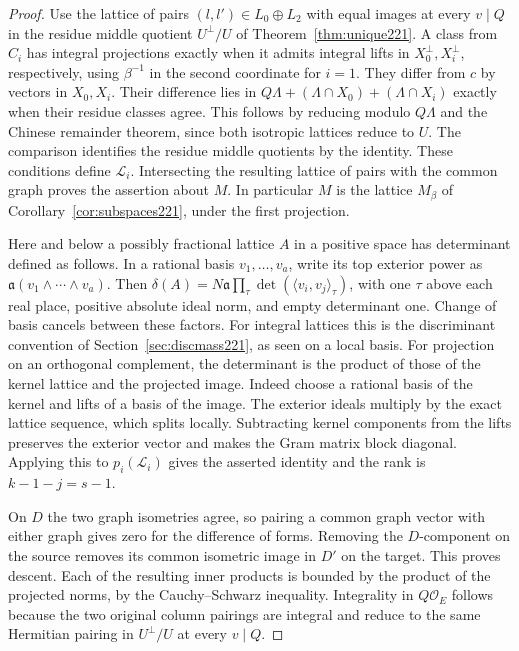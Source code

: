 \documentclass[a4paper,11pt]{article}
\theoremstyle{definition}
\theoremstyle{remark}
\numberwithin{equation}{section}
\newcommand{\OO}{\mathcal O}
\begin{document}
\begin{proof}
Use the lattice of pairs \((l,l')\in L_0\oplus L_2\) with
equal images at every \(v\mid Q\) in the residue middle
quotient \(U^\perp/U\) of Theorem~\ref{thm:unique221}.
A class from \(C_i\) has integral projections exactly when
it admits integral lifts in \(X_0^\perp,X_i^\perp\), respectively,
using \(\beta^{-1}\) in the second coordinate for \(i=1\).
They differ from \(c\) by vectors in \(X_0,X_i\). Their
difference lies in \(Q\Lambda+(\Lambda\cap X_0)+(\Lambda\cap X_i)\)
exactly when their residue classes agree. This follows by
reducing modulo \(Q\Lambda\) and the Chinese remainder
theorem, since both isotropic lattices reduce to \(U\).
The comparison identifies the residue middle quotients by
the identity. These conditions define \(\mathcal L_i\).
Intersecting the resulting lattice of pairs with the common
graph proves the assertion about \(M\). In particular \(M\)
is the lattice \(M_\beta\) of Corollary~\ref{cor:subspaces221},
under the first projection.

Here and below a possibly fractional lattice \(A\) in a
positive space has determinant defined as follows. In a
rational basis \(v_1,\ldots,v_a\), write its top exterior
power as \(\mathfrak a(v_1\wedge\cdots\wedge v_a)\).
Then \(\delta(A)=N\mathfrak a\prod_\tau\det
(\langle v_i,v_j\rangle_\tau)\), with one \(\tau\) above
each real place, positive absolute ideal norm, and empty
determinant one. Change of basis cancels between these
factors. For integral lattices this is the discriminant
convention of Section~\ref{sec:discmass221}, as seen on a
local basis. For projection on an orthogonal complement,
the determinant is the product of those of the kernel
lattice and the projected image. Indeed choose a rational
basis of the kernel and lifts of a basis of the image.
The exterior ideals multiply by the exact lattice sequence,
which splits locally. Subtracting kernel components from
the lifts preserves the exterior vector and makes the Gram
matrix block diagonal. Applying this to \(p_i(\mathcal L_i)\)
gives the asserted identity and the rank is \(k-1-j=s-1\).

On \(D\) the two graph isometries agree, so pairing a common
graph vector with either graph gives zero for the difference
of forms. Removing the \(D\)-component on the source removes
its common isometric image in \(D'\) on the target. This
proves descent. Each of the resulting inner products is
bounded by the product of the projected norms, by the
Cauchy--Schwarz inequality. Integrality in \(Q\OO_E\)
follows because the two original column pairings are
integral and reduce to the same Hermitian pairing in
\(U^\perp/U\) at every \(v\mid Q\).
\end{proof}
\end{document}
